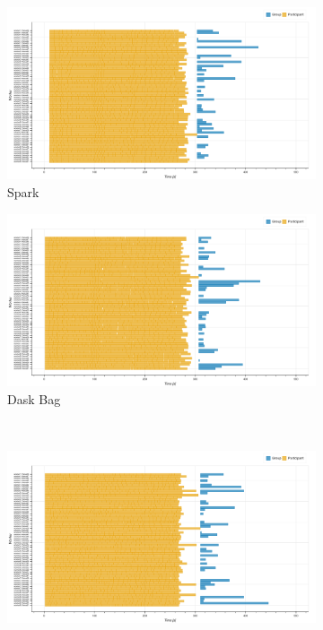 \documentclass[conference]{IEEEtran}
\begin{document}
\begin{figure}[!htb]
    \centering
    \begin{subfigure}[b]{\columnwidth}
        \includegraphics[clip,width=\columnwidth]{images/spark_bids_gantt.png}
        \caption{Spark}\label{fig:bids_spark_gantt}
    \end{subfigure}
    \hfill
    \begin{subfigure}[b]{\columnwidth}
        \includegraphics[clip,width=\columnwidth]{images/bag_bids_gantt.png}%
        \caption{Dask Bag}\label{fig:bids_dask_bag_gantt}
    \end{subfigure}
    \\
    \begin{subfigure}[b]{\columnwidth}
        \includegraphics[clip,width=\columnwidth]{images/delayed_bids_gantt.png}%

\end{subfigure}
\end{figure}
\end{document}
